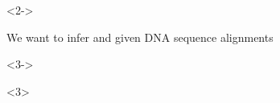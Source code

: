\begin{frame}[t]
    \vspace{3.5mm}

    \begin{minipage}[t][0.35\textheight][t]{\linewidth}
        \begin{uncoverenv}<2->
            \begin{center}
                We want to infer \textcolor{blue}{\divModel{}} and
                \textcolor{blue}{\divTimeMapVector} given DNA sequence
                alignments
                \textcolor{blue}{\alignmentVector}
            \end{center}
        \end{uncoverenv}


        \begin{uncoverenv}<3->
            \begin{displaybox}[0.85\linewidth]

                \begin{minipage}[c][0.1\textheight][c]{\linewidth}
                    \begin{onlyenv}<3>

                        \vspace{3.5mm}


\end{onlyenv}
\end{minipage}
\end{displaybox}
\end{uncoverenv}
\end{minipage}
\end{frame}
